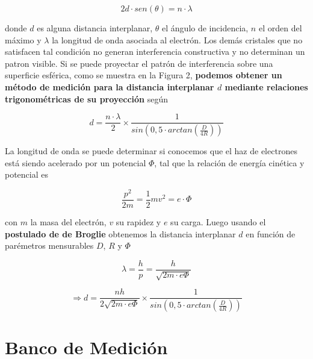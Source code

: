 \documentclass[a4paper, 10pt, spanish]{article}
\numberwithin{equation}{section}
\numberwithin{table}{section}
\begin{document}
\begin{equation}
2d\cdot sen(\theta) = n\cdot \lambda
\end{equation}

donde $d$ es alguna distancia interplanar, $\theta$ el ángulo de incidencia, $n$ el orden del máximo y $\lambda$ la longitud de onda asociada al electrón. Los demás cristales que no satisfacen tal condición no generan interferencia constructiva y no determinan un patron visible. Si se puede proyectar el patrón de interferencia sobre una superficie esférica, como se muestra en la Figura 2, \textbf{podemos obtener un método de medición para la distancia interplanar $d$ mediante relaciones trigonométricas de su proyección} según

\begin{equation} \label{eqn:trig}
d = \frac{n\cdot \lambda}{2} \times \frac{1}{sin(0,5 \cdot arctan(\frac{D}{4R}))} \nonumber
\end{equation}

La longitud de onda se puede determinar si conocemos que el haz de electrones está siendo acelerado por un potencial $\Phi$, tal que la relación de energía cinética y potencial es

\begin{equation} 
\frac{p^2}{2m} = \frac{1}{2}mv^2 = e\cdot \Phi \nonumber
\end{equation}





con $m$ la masa del electrón, $v$ su rapidez y $e$ su carga. Luego usando el \textbf{postulado de de Broglie} obtenemos la distancia interplanar $d$ en función de parémetros mensurables $D$, $R$ y $\Phi$

\begin{equation} \label{eq:longonda}
\lambda = \frac{h}{p} = \frac{h}{\sqrt{2m\cdot e \Phi}}  \nonumber
\end{equation}

\begin{equation} \label{eq:dist}
\Rightarrow d = \frac{nh}{2\sqrt{2m\cdot e \Phi}} \times \frac{1}{sin(0,5 \cdot arctan(\frac{D}{4R}))}
\end{equation}


\section{Banco de Medición}
\end{document}
